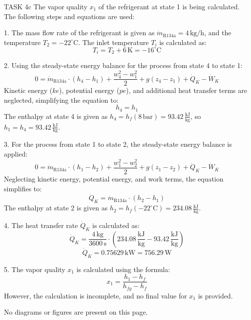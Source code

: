 TASK 4c  
The vapor quality \( x_1 \) of the refrigerant at state 1 is being calculated. The following steps and equations are used:

1. The mass flow rate of the refrigerant is given as \( \dot{m}_{\text{R134a}} = 4 \, \text{kg/h} \), and the temperature \( T_2 = -22^\circ\text{C} \).  
   The inlet temperature \( T_i \) is calculated as:  
   \[
   T_i = T_2 + 6 \, \text{K} = -16^\circ\text{C}
   \]

2. Using the steady-state energy balance for the process from state 4 to state 1:  
   \[
   0 = \dot{m}_{\text{R134a}} \cdot (h_4 - h_1) + \frac{w_4^2 - w_1^2}{2} + g(z_4 - z_1) + \dot{Q}_K - \dot{W}_K
   \]  
   Kinetic energy (\( ke \)), potential energy (\( pe \)), and additional heat transfer terms are neglected, simplifying the equation to:  
   \[
   h_4 = h_1
   \]  
   The enthalpy at state 4 is given as \( h_4 = h_f(8 \, \text{bar}) = 93.42 \, \frac{\text{kJ}}{\text{kg}} \), so \( h_1 = h_4 = 93.42 \, \frac{\text{kJ}}{\text{kg}} \).

3. For the process from state 1 to state 2, the steady-state energy balance is applied:  
   \[
   0 = \dot{m}_{\text{R134a}} \cdot (h_1 - h_2) + \frac{w_1^2 - w_2^2}{2} + g(z_1 - z_2) + \dot{Q}_K - \dot{W}_K
   \]  
   Neglecting kinetic energy, potential energy, and work terms, the equation simplifies to:  
   \[
   \dot{Q}_K = \dot{m}_{\text{R134a}} \cdot (h_2 - h_1)
   \]  
   The enthalpy at state 2 is given as \( h_2 = h_f(-22^\circ\text{C}) = 234.08 \, \frac{\text{kJ}}{\text{kg}} \).  

4. The heat transfer rate \( \dot{Q}_K \) is calculated as:  
   \[
   \dot{Q}_K = \frac{4 \, \text{kg}}{3600 \, \text{s}} \cdot \left( 234.08 \, \frac{\text{kJ}}{\text{kg}} - 93.42 \, \frac{\text{kJ}}{\text{kg}} \right)
   \]  
   \[
   \dot{Q}_K = 0.75629 \, \text{kW} = 756.29 \, \text{W}
   \]

5. The vapor quality \( x_1 \) is calculated using the formula:  
   \[
   x_1 = \frac{h_1 - h_f}{h_{fg} - h_f}
   \]  
   However, the calculation is incomplete, and no final value for \( x_1 \) is provided.

No diagrams or figures are present on this page.